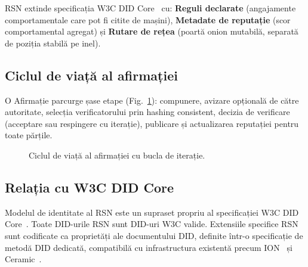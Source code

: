 \documentclass[11pt,a4paper,twocolumn]{article}
\begin{document}
RSN extinde specificația W3C DID Core~\cite{did2022} cu: \textbf{Reguli declarate} (angajamente comportamentale care pot fi citite de mașini), \textbf{Metadate de reputație} (scor comportamental agregat) și \textbf{Rutare de rețea} (poartă onion mutabilă, separată de poziția stabilă pe inel).

\subsection{Ciclul de viață al afirmației}

O Afirmație parcurge șase etape (Fig.~\ref{fig:lifecycle}): compunere, avizare opțională de către autoritate, selecția verificatorului prin hashing consistent, decizia de verificare (acceptare sau respingere cu iterație), publicare și actualizarea reputației pentru toate părțile.

\begin{figure}[ht]
\centering
{}
\caption{Ciclul de viață al afirmației cu bucla de iterație.}
\label{fig:lifecycle}
\end{figure}

\subsection{Relația cu W3C DID Core}

Modelul de identitate al RSN este un supraset propriu al specificației W3C DID Core~\cite{did2022}. Toate DID-urile RSN sunt DID-uri W3C valide. Extensiile specifice RSN sunt codificate ca proprietăți ale documentului DID, definite într-o specificație de metodă DID dedicată, compatibilă cu infrastructura existentă precum ION~\cite{buchner2021} și Ceramic~\cite{ceramic2023}.
\end{document}
